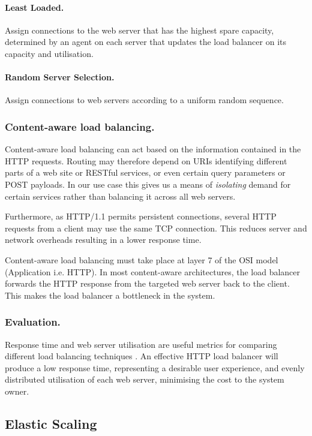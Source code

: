 \documentclass{llncs}
\begin{document}
\paragraph{Least Loaded.} Assign connections to the web server that has the highest spare capacity, determined by an agent on each server that updates the load balancer on its capacity and utilisation.

\paragraph{Random Server Selection.}  Assign connections to web servers according to a uniform random sequence.

\subsubsection{Content-aware load balancing.} Content-aware load balancing can act based on the information contained in the HTTP requests.  Routing may therefore depend on URIs identifying different parts of a web site or RESTful services, or even certain query parameters or POST payloads.  In our use case this gives us a means of {\itshape isolating} demand for certain services rather than balancing it across all web servers.

Furthermore, as HTTP/1.1 permits persistent connections, several HTTP requests from a client may use the same TCP connection.  This reduces server and network overheads resulting in a lower response time.

Content-aware load balancing must take place at layer 7 of the OSI model (Application i.e. HTTP).  In most content-aware architectures, the load balancer forwards the HTTP response from the targeted web server back to the client.  This makes the load balancer a bottleneck in the system.

\subsubsection{Evaluation.}
Response time and web server utilisation are useful metrics for comparing different load balancing techniques \cite{bryhni2000comparison}.  An effective HTTP load balancer will produce a low response time, representing a desirable user experience, and evenly distributed utilisation of each web server, minimising the cost to the system owner.

\subsection{Elastic Scaling}
\end{document}
